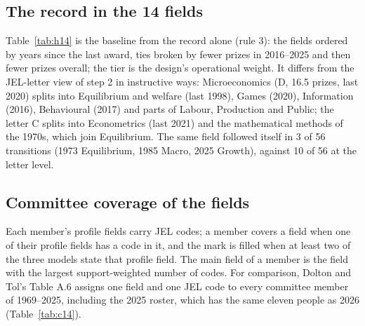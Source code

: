 \documentclass[11pt,a4paper]{article}
\newcommand{\code}[1]{\texttt{#1}}
\begin{document}
\subsection{The record in the 14 fields}

Table~\ref{tab:h14} is the baseline from the record alone (rule 3): the fields ordered by years since the last award,
ties broken by fewer prizes in 2016--2025 and then fewer prizes overall; the tier is the design's operational weight.
It differs from the JEL-letter view of step 2 in instructive ways: Microeconomics (D, 16.5 prizes, last 2020) splits
into Equilibrium and welfare (last 1998), Games (2020), Information (2016), Behavioural (2017) and parts of Labour,
Production and Public; the letter C splits into Econometrics (last 2021) and the mathematical methods of the 1970s,
which join Equilibrium. The same field followed itself in 3 of 56 transitions (1973 Equilibrium, 1985 Macro, 2025
Growth), against 10 of 56 at the letter level.

\begin{table}[h]
\centering
\small
\resizebox{\textwidth}{!}{}
\caption{The 64 prize works in the 14 fields (share-weighted prizes; years since the last award to 2026; median gap
between award years; prizes in 2021--25 and 2016--25; operational tier of the design). Written by the step-4a
notebook to \code{tables/fields14\_history.tex}.}
\label{tab:h14}
\end{table}

\subsection{Committee coverage of the fields}

Each member's profile fields carry JEL codes; a member covers a field when one of their profile fields has a code in
it, and the mark is filled when at least two of the three models state that profile field. The main field of a member
is the field with the largest support-weighted number of codes. For comparison, Dolton and Tol's Table A.6 assigns
one field and one JEL code to every committee member of 1969--2025, including the 2025 roster, which has the same
eleven people as 2026 (Table~\ref{tab:c14}).

\begin{table}[h]
\centering
\small
\resizebox{\textwidth}{!}{}
\caption{Coverage of the 14 fields by the 2026 committee according to the step-1 profiles ($\bullet$ stated by 2--3 models, $\circ$ by one), with Dolton and Tol's one-field assignment. Em econometrics, Eq equilibrium, Gm games, Bh behavioural, Lb labour, IO production and IO, Pb public, In information, Ma macro, Tr trade, Fi finance, Dv development and economic history, Gr growth, Re resources.}
\label{tab:c14}
\end{table}
\end{document}

